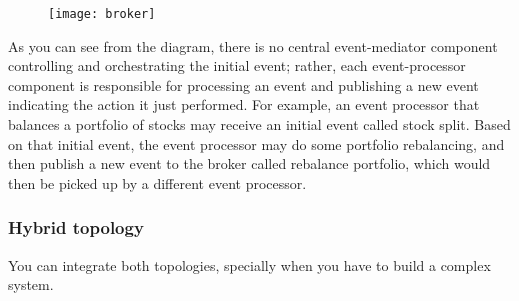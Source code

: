 \documentclass[11pt]{article} %
\begin{document}
\begin{figure} [H]
	\centering
	\texttt{[image: broker]}
\end{figure}

As you can see from the diagram, there is no central event-mediator component controlling and orchestrating the initial event; rather, each event-processor component is responsible for processing an event and publishing a new event indicating the action it just performed. For example, an event processor that balances a portfolio of stocks may receive an initial event called stock split. Based on that initial event, the event processor may do some portfolio rebalancing, and then publish a new event to the broker called rebalance portfolio, which would then be picked up by a different event processor. 

\subsubsection{Hybrid topology}
You can integrate both topologies, specially when you have to build a complex system.
\end{document}
